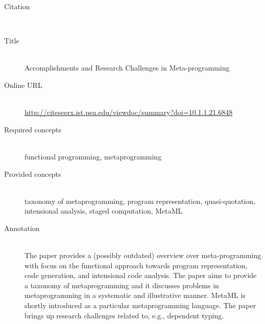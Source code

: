 \begin{description}
\item[Citation]\mbox{}\\
\cite{Sheard01}
\item[Title]\mbox{}\\
Accomplishments and Research Challenges in Meta-programming
\item[Online URL]\mbox{}\\
{\footnotesize\url{http://citeseerx.ist.psu.edu/viewdoc/summary?doi=10.1.1.21.6848}}
\item[Required concepts]\mbox{}\\
functional programming, metaprogramming\item[Provided concepts]\mbox{}\\
taxonomy of metaprogramming, program representation, quasi-quotation, intensional analysis, staged computation, MetaML\item[Annotation]\mbox{}\\
The paper provides a (possibly outdated) overview over meta-programming with focus on the functional approach towards program representation, code generation, and intensional code analysis. The paper aims to provide a taxonomy of metaprogramming and it discusses problems in metaprogramming in a systematic and illustrative manner. MetaML is shortly introduced as a particular metaprogramming language. The paper brings up research challenges related to, e.g., dependent typing.
\end{description}


